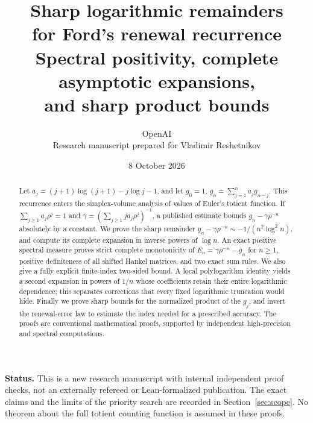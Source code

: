\documentclass[11pt,a4paper]{article}
\title{\color{ink}\bfseries Sharp logarithmic remainders\\
  for Ford's renewal recurrence\\[6pt]
  \large Spectral positivity, complete asymptotic expansions,\\
  and sharp product bounds}
\author{OpenAI\\\small Research manuscript prepared for Vladimir Reshetnikov}
\date{8 October 2026}
\numberwithin{equation}{section}
\theoremstyle{definition}
\theoremstyle{remark}
\begin{document}
\maketitle
\begin{abstract}
Let $a_j=(j+1)\log(j+1)-j\log j-1$, and let $g_0=1$,
$g_n=\sum_{j=1}^n a_jg_{n-j}$. This recurrence enters the simplex-volume
analysis of values of Euler's totient function. If
$\sum_{j\ge1}a_j\rho^j=1$ and
$\gamma=(\sum_{j\ge1}ja_j\rho^j)^{-1}$, a published estimate bounds
$g_n-\gamma\rho^{-n}$ absolutely by a constant. We prove the sharp
remainder $g_n-\gamma\rho^{-n}\sim-1/(n^2\log^2n)$, and compute its
complete expansion in inverse powers of $\log n$. An exact positive
spectral measure proves strict complete monotonicity of
$E_n=\gamma\rho^{-n}-g_n$ for $n\ge1$, positive definiteness of all
shifted Hankel matrices, and two exact sum rules. We also give a
fully explicit finite-index two-sided bound. A local polylogarithm
identity yields a second expansion in powers of $1/n$ whose coefficients
retain their entire logarithmic dependence; this separates corrections
that every fixed logarithmic truncation would hide. Finally we prove
sharp bounds for the normalized product of the $g_j$, and invert the
renewal-error law to estimate the index needed for a prescribed accuracy.
The proofs are conventional mathematical proofs, supported by independent
high-precision and spectral computations.
\end{abstract}

\smallskip
{\small\textbf{Status.} This is a new research manuscript with internal
independent proof checks, not an externally refereed or Lean-formalized
publication. The exact claims and the limits of the priority search are
recorded in Section~\ref{sec:scope}. No theorem about the full totient
counting function is assumed in these proofs.}

\tableofcontents
\newpage









\end{document}
